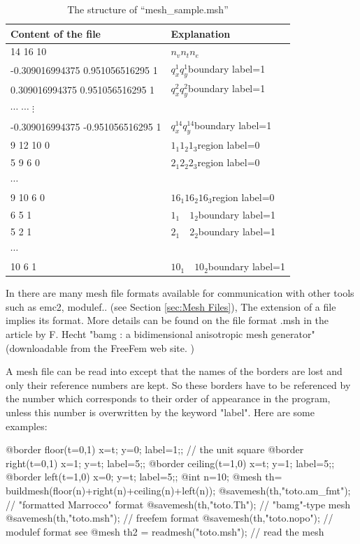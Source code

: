 \documentclass[a4paper,twoside,12pt]{book}
\def\refSec#1{Section \ref{sec:#1}}
\begin{document}
\begin{table}[htbp]
\begin{tabular}{|l|l|}
\hline
Content of the file & Explanation\\
\hline
14 16 10& $n_v$\qquad  $n_t$\qquad $n_e$\\
-0.309016994375 0.951056516295 1& $q^1_x$\qquad $q^1_y$\qquad boundary label=1\\
0.309016994375 0.951056516295 1& $q^2_x$\qquad $q^2_y$\qquad boundary label=1\\
$\cdots$  $\cdots$ $\vdots$& \\
-0.309016994375 -0.951056516295 1& $q^{14}_x$\qquad $q^{14}_y$\qquad boundary label=1\\
\hline
9 12 10 0&$1_1$\quad $1_2$\quad $1_3$\quad region label=0 \\
5 9 6 0&$2_1$\quad $2_2$\quad $2_3$\quad region label=0  \\
$\cdots$& \\
9 10 6 0&$16_1$\quad $16_2$\quad $16_3$\quad region label=0 \\
\hline
6 5 1&$1_1\quad 1_2$\quad boundary label=1\\
5 2 1&$2_1\quad 2_2$\quad boundary label=1\\
$\cdots$& \\
10 6 1&$10_1\quad 10_2$\quad boundary label=1\\
\hline
\end{tabular}
  \caption{The structure of ``mesh\_sample.msh''
  \label{tab:meshSample}}
\end{table}

In \freefempp there are many mesh file formats available for communication with other tools such as emc2, modulef.. (see
\refSec{Mesh Files}), The extension of a file implies its format. More details can be found on the file format .msh in
the article by F. Hecht "bamg : a bidimensional anisotropic mesh generator" (downloadable from the FreeFem web site. )




A mesh file can be read into \freefempp except that the names of the borders are lost and only their reference numbers
are kept. So these borders have to be referenced by the number which corresponds to their order of appearance in the
program, unless this number is overwritten by the keyword "label".  Here are some examples:

\bFF
@border floor(t=0,1){ x=t; y=0; label=1;}; // the unit square
@border right(t=0,1){ x=1; y=t; label=5;};
@border ceiling(t=1,0){ x=t; y=1; label=5;};
@border left(t=1,0){ x=0; y=t; label=5;};
@int n=10;
@mesh th= buildmesh(floor(n)+right(n)+ceiling(n)+left(n));
@savemesh(th,"toto.am_fmt");  // "formatted Marrocco" format 
@savemesh(th,"toto.Th");      // "bamg"-type mesh   
@savemesh(th,"toto.msh");     // freefem format 
@savemesh(th,"toto.nopo");     // modulef format  see \cite{modulef}
@mesh th2 = readmesh("toto.msh"); // read the mesh
\end{document}
